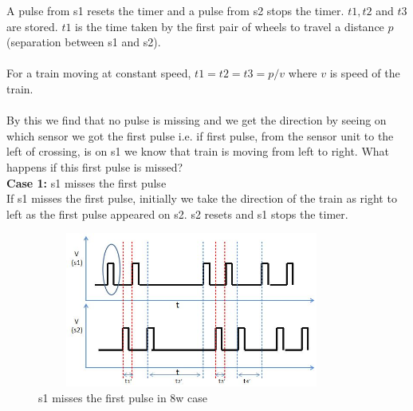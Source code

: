 \documentclass[aps,letterpaper,11pt]{article}
\begin{document}
A pulse from s1 resets the timer and a pulse from s2 stops the timer. $t1, t2
$ and $t3$  are stored. $t1$ is
the time taken by the first pair of wheels to travel a distance $p$(separation
between s1 and s2). \\ \\
For a train moving at constant speed, $t1 = t2 = t3 = p/v$ where $v$ is speed
of the train. \\ \\
By this we find that no pulse is missing and we get the direction by seeing on
which sensor we got the first pulse i.e. if first pulse, from the sensor unit
to the left of crossing, is on s1 we know that train is moving from left to
right. What happens if this first pulse is missed? \\

\textbf{Case 1:} s1 misses the first pulse \\
If s1 misses the first pulse, initially we take the direction of the train as
right to left as the first pulse appeared on s2. s2 resets and s1 stops the
timer.
\begin{figure}[H]
\begin{center}
\includegraphics[height = 2in,width=4in,angle=00]{figures/w8_pulse_missing.JPG}
\caption{\small s1 misses the first pulse in 8w case}
\end{center}
\end{figure}
\end{document}
